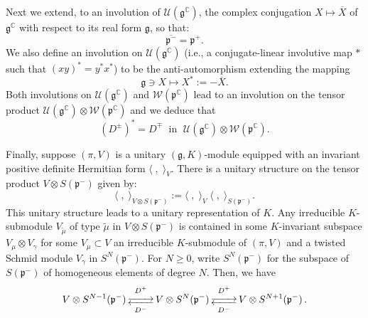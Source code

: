 \documentclass{amsart}[draft,11pt]
\newcommand{\myrightleftarrows}[1]{\mathrel{\substack{\xrightarrow{#1} \\[-.9ex] \xleftarrow{#1}}}}
\newcommand{\fg}{{\mathfrak{g}}}
\newcommand{\fp}{{\mathfrak{p}}}
\newcommand{\CC}{{\mathbb{C}}}
\newcommand{\cW}{{\mathcal{W}}}
\numberwithin{equation}{section}
\theoremstyle{definition}
\begin{document}
Next we extend, to an involution of $\mathcal{U}(\fg^\mathbb{C})$, the complex conjugation $X\mapsto \overline{X}$ of $\fg^\mathbb{C}$ with respect to its real form $\fg$, 
so that:
\[\overline{\fp^-}=\fp^{+}.\]
We also define an involution on $\mathcal{U}(\fg^\CC)$ (i.e., a conjugate-linear involutive map $*$
such that $(xy)^* = y^*x^*$)
to be the anti-automorphism extending the mapping 
%
\[
\fg\ni X\mapsto X^*:=-\overline{X}.
\]
%
Both involutions on $\mathcal{U}(\fg^\CC)$ and
$\mathcal{W}(\fp^\CC)$ lead to 
an involution on the tensor product
$\mathcal{U}(\fg^\CC)\otimes\mathcal{W}(\fp^\CC)$
and we deduce that 
%
\begin{equation}\label{starD}
(D^\pm)^*=D^\mp\;\text{ in }\;\mathcal{U}(\fg^\CC)\otimes\cW(\fp^\CC).
\end{equation}
%

Finally, suppose $(\pi,V)$ is a unitary $(\fg,K)$-module equipped with an invariant positive definite Hermitian form 
$\langle\;,\;\rangle_V$. There is a unitary structure on the tensor product $V\otimes S(\fp^-)$ given by:
%
\begin{equation}\label{unitTensor}
\langle\;,\;\rangle_{V\otimes S(\fp^-)}:=\langle\;,\;\rangle_V\;\langle\;,\;\rangle_{S(\fp^-)}.
\end{equation}
%
This unitary structure leads to a unitary 
representation of $K$. Any irreducible $K$-submodule $V_{\tilde{\mu}}$ of type $\tilde{\mu}$ in $V\otimes S(\fp^-)$ is contained in some $K$-invariant subspace $V_\mu \otimes V_\gamma$ for some 
$V_\mu \subset V$ an irreducible $K$-submodule of $(\pi,V)$ and a twisted Schmid module $V_\gamma$ in $S^N(\fp^-)$. For $N\geq 0$, write $S^N(\fp^-)$ for the subspace of $S(\fp^-)$ of homogeneous elements of degree $N$. Then, we have
$$
V\otimes S^{N-1}(\fp^-)
\mathop{\myrightleftarrows{\rule{7mm}{0cm}}}\limits^{D^+}_{D^-}
V\otimes S^{N}(\fp^-)
\mathop{
     \myrightleftarrows{\rule{7mm}{0cm}}
}\limits^{D^+}_{D^-}
V\otimes S^{N+1}(\fp^-)\,.
$$
\end{document}
